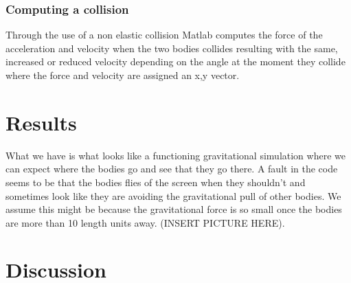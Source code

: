 \documentclass[11pt]{article}
\begin{document}
\subsubsection{Computing a collision}
Through the use of a non elastic collision Matlab computes the force of the acceleration and velocity when the two bodies collides resulting with the same, increased or reduced velocity depending on the angle at the moment they collide where the force and velocity are assigned an x,y vector.

\section{Results}
What we have is what looks like a functioning gravitational simulation where we can expect where the bodies go and see that they go there. A fault in the code seems to be that the bodies flies of the screen when they shouldn't and sometimes look like they are avoiding the gravitational pull of other bodies. We assume this might be because the gravitational force is so small once the bodies are more than 10 length units away. (INSERT PICTURE HERE).

\section{Discussion}

\printbibliography
\end{document}
